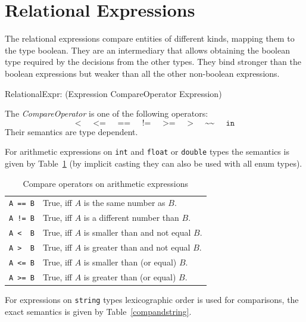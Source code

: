 \section{Relational Expressions}\label{sec:relational}

The relational expressions compare entities of different kinds, mapping them to the type boolean.
They are an intermediary that allows obtaining the boolean type required by the decisions from the other types.
They bind stronger than the boolean expressions but weaker than all the other non-boolean expressions.

\begin{rail}
 RelationalExpr: (Expression CompareOperator Expression)
\end{rail}

The \emph{CompareOperator} is one of the following operators:
\[ \texttt{<} \;\;\;\;\; \texttt{<=} \;\;\;\;\; \texttt{==} \;\;\;\;\; \texttt{!=} \;\;\;\;\; \texttt{>=} \;\;\;\;\; \texttt{>} \;\;\;\;\; \texttt{\textasciitilde\textasciitilde} \;\;\;\;\; \texttt{in} \]
Their semantics are type dependent.

For arithmetic expressions on \texttt{int} and \texttt{float} or \texttt{double} types
the semantics is given by Table~\ref{compandarithmetic} (by implicit casting they can also be used with all enum types).

\begin{table}[htbp]
  \centering
  \begin{tabularx}{\linewidth}{|l|X|} \hline
    \texttt{A == B} & True, iff $A$ is the same number as $B$. \\
    \texttt{A != B} & True, iff $A$ is a different number than $B$. \\
    \texttt{A <\ \ B} & True, iff $A$ is smaller than and not equal $B$. \\
    \texttt{A >\ \ B} & True, iff $A$ is greater than and not equal $B$. \\
    \texttt{A <= B} & True, iff $A$ is smaller than (or equal) $B$. \\
    \texttt{A >= B} & True, iff $A$ is greater than (or equal) $B$. \\ \hline
  \end{tabularx}
  \caption{Compare operators on arithmetic expressions}
  \label{compandarithmetic}
\end{table}

For expressions on \texttt{string} types lexicographic order is used for comparisons,
the exact semantics is given by Table~\ref{compandstring}.

